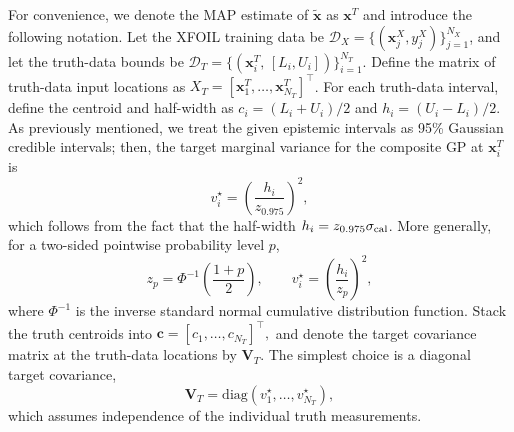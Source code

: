\documentclass[a4paper,12pt]{article}
\newcommand{\T}{\textnormal}
\newcommand{\x}{\mathbf{x}}
\begin{document}
For convenience, we denote the MAP estimate of $\tilde{\x}$ as $\x^T$ and introduce the following notation. Let the XFOIL training data be
$\mathcal{D}_X=\{(\x^{X}_j,y^{X}_j)\}_{j=1}^{N_X}$, and let the truth-data
bounds be $\mathcal{D}_T=\{(\x^{T}_i,\,[L_i,U_i])\}_{i=1}^{N_T}$.  Define the
matrix of truth-data input locations as $X_T=[\x^{T}_1,\ldots,\x^{T}_{N_T}]^\top$.
For each truth-data interval, define the centroid and half-width as
$c_i=(L_i+U_i)/2$ and $h_i=(U_i-L_i)/2$.
As previously mentioned, we treat the given epistemic intervals as 95\% Gaussian
credible intervals; then, the target marginal variance for the composite GP at
$\x_i^T$ is
\begin{equation*}
    v_i^\star
    =
    \left(
    \frac{h_i}{z_{0.975}}
    \right)^2,
    \label{eq:target_variance_95}
\end{equation*}
which follows from the fact that the half-width $h_i = z_{0.975} \sigma_{\T{cal}}$. More generally, for a two-sided pointwise probability level $p$,
\begin{equation*}
    z_p
    =
    \Phi^{-1}
    \left(
    \frac{1+p}{2}
    \right),
    \qquad
    v_i^\star
    =
    \left(
    \frac{h_i}{z_p}
    \right)^2 ,
\end{equation*}
where $\Phi^{-1}$ is the inverse standard normal cumulative distribution
function. Stack the truth centroids into $\mathbf{c}
    =
    \left[
    c_1,\ldots,c_{N_T}
    \right]^\top,$ and denote the target covariance matrix at the truth-data locations by
$\mathbf{V}_T$.  The simplest choice is a diagonal target covariance,
\begin{equation}
    \mathbf{V}_T
    =
    \mathrm{diag}
    \left(
    v_1^\star,\ldots,v_{N_T}^\star
    \right),
    \label{eq:diagonal_target_covariance}
\end{equation}
which assumes independence of the individual truth measurements. 
\end{document}
